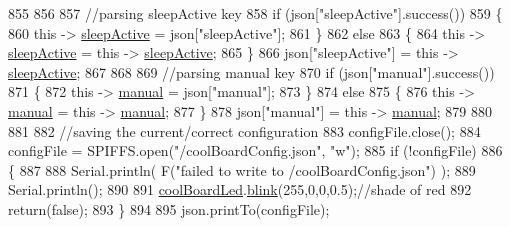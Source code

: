 \begin{DoxyCode}
855 
856             
857             \textcolor{comment}{//parsing sleepActive key}
858             \textcolor{keywordflow}{if} (json[\textcolor{stringliteral}{"sleepActive"}].success())
859             \{
860                 \textcolor{keyword}{this} -> \hyperlink{class_cool_board_a0a51b2287139f66c738101fb53139230}{sleepActive} = json[\textcolor{stringliteral}{"sleepActive"}];
861             \}
862             \textcolor{keywordflow}{else}
863             \{
864                 \textcolor{keyword}{this} -> \hyperlink{class_cool_board_a0a51b2287139f66c738101fb53139230}{sleepActive} = \textcolor{keyword}{this} -> \hyperlink{class_cool_board_a0a51b2287139f66c738101fb53139230}{sleepActive};
865             \}
866             json[\textcolor{stringliteral}{"sleepActive"}] = \textcolor{keyword}{this} -> \hyperlink{class_cool_board_a0a51b2287139f66c738101fb53139230}{sleepActive};
867 
868 
869             \textcolor{comment}{//parsing manual key}
870             \textcolor{keywordflow}{if} (json[\textcolor{stringliteral}{"manual"}].success())
871             \{
872                 \textcolor{keyword}{this} -> \hyperlink{class_cool_board_a7c8e505a5804b109e112d5a03df6ea2b}{manual} = json[\textcolor{stringliteral}{"manual"}];
873             \}
874             \textcolor{keywordflow}{else}
875             \{
876                 \textcolor{keyword}{this} -> \hyperlink{class_cool_board_a7c8e505a5804b109e112d5a03df6ea2b}{manual} = \textcolor{keyword}{this} -> \hyperlink{class_cool_board_a7c8e505a5804b109e112d5a03df6ea2b}{manual};
877             \}
878             json[\textcolor{stringliteral}{"manual"}] = \textcolor{keyword}{this} -> \hyperlink{class_cool_board_a7c8e505a5804b109e112d5a03df6ea2b}{manual};
879 
880 
881 
882             \textcolor{comment}{//saving the current/correct configuration}
883             configFile.close();
884             configFile = SPIFFS.open(\textcolor{stringliteral}{"/coolBoardConfig.json"}, \textcolor{stringliteral}{"w"});
885             \textcolor{keywordflow}{if} (!configFile)
886             \{
887             
888                 Serial.println( F(\textcolor{stringliteral}{"failed to write to /coolBoardConfig.json"}) );
889                 Serial.println();
890 
891                 \hyperlink{class_cool_board_a1b1d3c684a5baa56b08486e192fd8e97}{coolBoardLed}.\hyperlink{class_cool_board_led_a96e1ea13003eee34c9dbcef340404426}{blink}(255,0,0,0.5);\textcolor{comment}{//shade of red     }
892                 \textcolor{keywordflow}{return}(\textcolor{keyword}{false});
893             \}
894 
895             json.printTo(configFile);

\end{DoxyCode}

